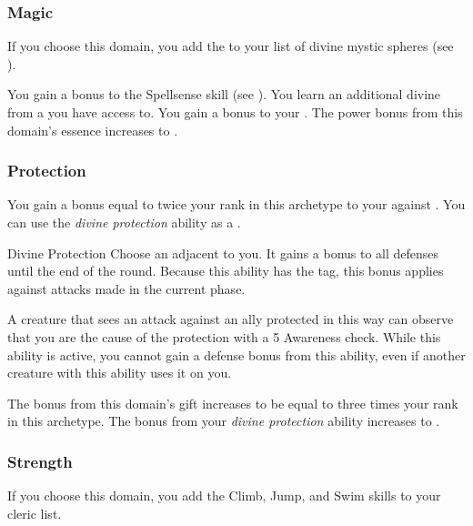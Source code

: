         \subsubsection{Magic}
            If you choose this domain, you add the   to your list of divine mystic spheres (see ).

             You gain a  bonus to the Spellsense skill (see ).
             You learn an additional divine  from a  you have access to.
             You gain a  bonus to your  .
             The power bonus from this domain's essence increases to .

        \subsubsection{Protection}
             You gain a bonus equal to twice your rank in this archetype to your  against .
             You can use the \textit{divine protection} ability as a .
            \begin{durationability}{Divine Protection}
                \rankline
                Choose an  adjacent to you.
                It gains a  bonus to all defenses until the end of the round.
                Because this ability has the  tag, this bonus applies against attacks made in the current phase.

                A creature that sees an attack against an ally protected in this way can observe that you are the cause of the protection with a  5 Awareness check.
                While this ability is active, you cannot gain a defense bonus from this ability, even if another creature with this ability uses it on you.
            \end{durationability}
             The bonus from this domain's gift increases to be equal to three times your rank in this archetype.
             The bonus from your \textit{divine protection} ability increases to .

        \subsubsection{Strength}
            If you choose this domain, you add the Climb, Jump, and Swim skills to your cleric  list.

